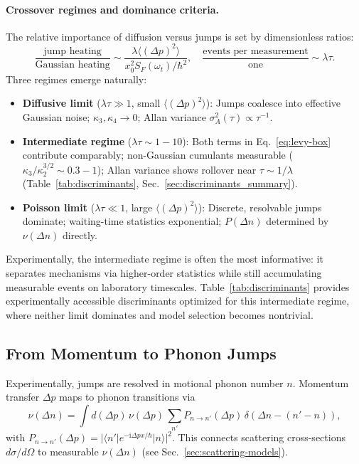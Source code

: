 \paragraph{Crossover regimes and dominance criteria.}
The relative importance of diffusion versus jumps is set by dimensionless ratios:
\begin{equation}
\frac{\text{jump heating}}{\text{Gaussian heating}}
\sim \frac{\lambda \langle (\Delta p)^2 \rangle}{x_0^2 S_F(\omega_t)/\hbar^2},
\quad
\frac{\text{events per measurement}}{\text{one}}
\sim \lambda \tau.
\end{equation}
Three regimes emerge naturally:
\begin{itemize}
\item \textbf{Diffusive limit} ($\lambda \tau \gg 1$, small $\langle(\Delta p)^2\rangle$):
  Jumps coalesce into effective Gaussian noise;
  $\kappa_3, \kappa_4 \to 0$;
  Allan variance $\sigma_A^2(\tau) \propto \tau^{-1}$.
\item \textbf{Intermediate regime} ($\lambda \tau \sim 1{-}10$):
  Both terms in Eq.~\eqref{eq:levy-box} contribute comparably;
  non-Gaussian cumulants measurable ($\kappa_3/\kappa_2^{3/2} \sim 0.3{-}1$);
  Allan variance shows rollover near $\tau \sim 1/\lambda$
  (Table~\ref{tab:discriminants}, Sec.~\ref{sec:discriminants_summary}).
\item \textbf{Poisson limit} ($\lambda \tau \ll 1$, large $\langle(\Delta p)^2\rangle$):
  Discrete, resolvable jumps dominate;
  waiting-time statistics exponential;
  $P(\Delta n)$ determined by $\nu(\Delta n)$ directly.
\end{itemize}
Experimentally, the intermediate regime is often the most informative:
it separates mechanisms via higher-order statistics while still accumulating
measurable events on laboratory timescales.
Table~\ref{tab:discriminants} provides experimentally accessible discriminants optimized for this intermediate regime, where neither limit dominates and model selection becomes nontrivial.

\subsection{From Momentum to Phonon Jumps}
Experimentally, jumps are resolved in motional phonon number $n$.
Momentum transfer $\Delta p$ maps to phonon transitions via
\begin{equation}
\nu(\Delta n) = \int d(\Delta p)\,\nu(\Delta p)\,\sum_{n'} P_{n\to n'}(\Delta p)\, \delta(\Delta n-(n'-n)),
\label{eq:nu_to_deltan}
\end{equation}
with $P_{n\to n'}(\Delta p)=|\langle n'|e^{-\mathrm{i}\Delta p x/\hbar}|n\rangle|^2$.
This connects scattering cross-sections $d\sigma/d\Omega$ to measurable $\nu(\Delta n)$ (see Sec.~\ref{sec:scattering-models}).

